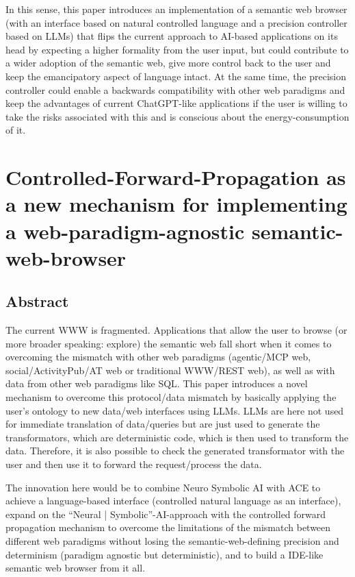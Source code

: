 \documentclass[12pt,a4paper]{article}
\begin{document}
In this sense, this paper introduces an implementation of a semantic web browser (with an interface based on natural controlled language and a precision controller based on LLMs) that flips the current approach to AI-based applications on its head by expecting a higher formality from the user input, but could contribute to a wider adoption of the semantic web, give more control back to the user and keep the emancipatory aspect of language intact. At the same time, the precision controller could enable a backwards compatibility with other web paradigms and keep the advantages of current ChatGPT-like applications if the user is willing to take the risks associated with this and is conscious about the energy-consumption of it.

\newpage

\section{Controlled-Forward-Propagation as a new mechanism for implementing a web-paradigm-agnostic semantic-web-browser}

\subsection{Abstract}

The current WWW is fragmented. Applications that allow the user to browse (or more broader speaking: explore) the semantic web fall short when it comes to overcoming the mismatch with other web paradigms (agentic/MCP web, social/ActivityPub/AT web or traditional WWW/REST web), as well as with data from other web paradigms like SQL. This paper introduces a novel mechanism to overcome this protocol/data mismatch by basically applying the user's ontology to new data/web interfaces using LLMs. LLMs are here not used for immediate translation of data/queries but are just used to generate the transformators, which are deterministic code, which is then used to transform the data. Therefore, it is also possible to check the generated transformator with the user and then use it to forward the request/process the data.

The innovation here would be to combine Neuro Symbolic AI with ACE to achieve a language-based interface (controlled natural language as an interface), expand on the ``Neural | Symbolic''-AI-approach with the controlled forward propagation mechanism to overcome the limitations of the mismatch between different web paradigms without losing the semantic-web-defining precision and determinism (paradigm agnostic but deterministic), and to build a IDE-like semantic web browser from it all.
\end{document}
